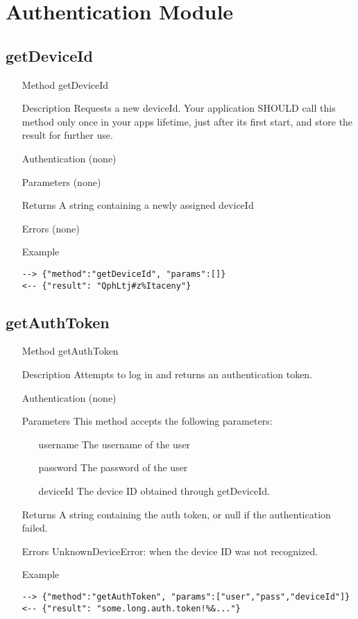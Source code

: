 \documentclass[a4paper]{scrreprt}
\begin{document}
\section{Authentication Module}\label{sec:authmodule}
\subsection{getDeviceId}\label{m:getDeviceId}
\begin{enumerate}
\item[Method] getDeviceId
\item[Description] Requests a new deviceId. Your application SHOULD call this method only once in your apps lifetime, just after its first start, and store the result for further use.
\item[Authentication] (none)
\item[Parameters] (none)
\item[Returns] A string containing a newly assigned deviceId
\item[Errors] (none)
\item[Example]
\begin{lstlisting}
--> {"method":"getDeviceId", "params":[]}
<-- {"result": "QphLtj#z%Itaceny"}
\end{lstlisting}
\end{enumerate}

\subsection{getAuthToken}\label{m:getAuthToken}
\begin{enumerate}
\item[Method] getAuthToken
\item[Description] Attempts to log in and returns an authentication token.
\item[Authentication] (none)
\item[Parameters] This method accepts the following parameters:
\begin{enumerate}
    \item[username] The username of the user
    \item[password] The password of the user
    \item[deviceId] The device ID obtained through getDeviceId.
    \end{enumerate}
\item[Returns] A string containing the auth token, or null if the authentication failed.
\item[Errors] UnknownDeviceError: when the device ID was not recognized.
\item[Example]
\begin{lstlisting}
--> {"method":"getAuthToken", "params":["user","pass","deviceId"]}
<-- {"result": "some.long.auth.token!%&..."}
\end{lstlisting}
\end{enumerate}
\end{document}
